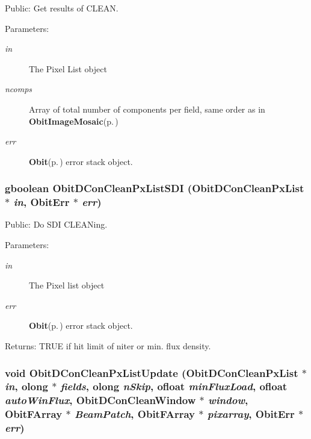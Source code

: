 Public: Get results of CLEAN. 

\begin{Desc}
\item[Parameters:]
\begin{description}
\item[{\em in}]The Pixel List object \item[{\em ncomps}]Array of total number of components per field, same order as in {\bf Obit\-Image\-Mosaic}{\rm (p.\,\pageref{structObitImageMosaic})} \item[{\em err}]{\bf Obit}{\rm (p.\,\pageref{structObit})} error stack object. \end{description}
\end{Desc}
\subsubsection{\setlength{\rightskip}{0pt plus 5cm}gboolean Obit\-DCon\-Clean\-Px\-List\-SDI ({\bf Obit\-DCon\-Clean\-Px\-List} $\ast$ {\em in}, {\bf Obit\-Err} $\ast$ {\em err})}\label{ObitDConCleanPxList_8h_a22}


Public: Do SDI CLEANing. 

\begin{Desc}
\item[Parameters:]
\begin{description}
\item[{\em in}]The Pixel list object \item[{\em err}]{\bf Obit}{\rm (p.\,\pageref{structObit})} error stack object. \end{description}
\end{Desc}
\begin{Desc}
\item[Returns:]TRUE if hit limit of niter or min. flux density. \end{Desc}
\subsubsection{\setlength{\rightskip}{0pt plus 5cm}void Obit\-DCon\-Clean\-Px\-List\-Update ({\bf Obit\-DCon\-Clean\-Px\-List} $\ast$ {\em in}, {\bf olong} $\ast$ {\em fields}, {\bf olong} {\em n\-Skip}, {\bf ofloat} {\em min\-Flux\-Load}, {\bf ofloat} {\em auto\-Win\-Flux}, {\bf Obit\-DCon\-Clean\-Window} $\ast$ {\em window}, {\bf Obit\-FArray} $\ast$ {\em Beam\-Patch}, {\bf Obit\-FArray} $\ast$ {\em pixarray}, {\bf Obit\-Err} $\ast$ {\em err})}\label{ObitDConCleanPxList_8h_a20}


